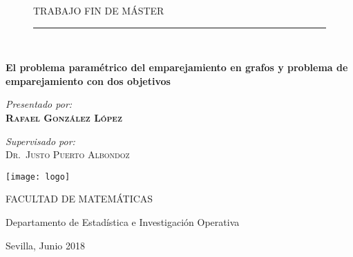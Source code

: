 \documentclass[twoside,a4paper,openright,12pt]{book}
\begin{document}
\begin{titlepage}

\vspace*{1in}
\begin{center}
\vspace*{-1in}
\begin{figure}[htb]
\begin{center}
\begin{large}
TRABAJO FIN DE MÁSTER\\
\end{large}
\rule{80mm}{0.1mm}\\
\vspace*{0.1in}
\end{center}
\end{figure}
\begin{large}
\end{large}

\vspace*{0.2in}
\begin{Large}
{\huge \bfseries El problema paramétrico del emparejamiento en grafos y
problema de emparejamiento con dos objetivos}\\[2cm]
\end{Large}

\begin{center} \Large
\emph{Presentado por:}\\
\textsc{ \bf{Rafael González López}}
\end{center}

\vspace*{0.2in}
\begin{center} \large
\emph{Supervisado por:} \\
\textsc{Dr.~Justo Puerto Albondoz}\\
\end{center}
\vspace*{0.2in}

\centering
\texttt{[image: logo]}



\begin{large}
\centering
FACULTAD DE MATEMÁTICAS \\
\end{large} 

\begin{large}
Departamento de Estadística e Investigación Operativa\\
\end{large}


\begin{large}
\centering
Sevilla, Junio 2018\\
 \end{large}
\end{center}


\end{titlepage}
\end{document}
